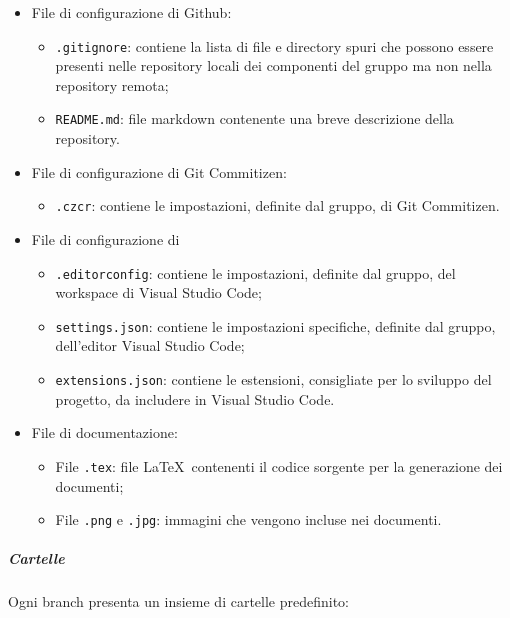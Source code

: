 \documentclass[../norme-di-progetto.tex]{subfiles}
\begin{document}
\begin{itemize}
  \item File di configurazione di Github:
  \begin{itemize}
    \item \texttt{.gitignore}: contiene la lista di file e directory spuri che possono essere presenti nelle repository locali dei componenti del gruppo ma non nella repository remota;
    \item \texttt{README.md}: file markdown contenente una breve descrizione della repository.
  \end{itemize}
  \item File di configurazione di Git Commitizen:
  \begin{itemize}
    \item \texttt{.czcr}: contiene le impostazioni, definite dal gruppo, di Git Commitizen.
  \end{itemize}
  \item File di configurazione di 
  \begin{itemize}
    \item \texttt{.editorconfig}: contiene le impostazioni, definite dal gruppo, del workspace di Visual Studio Code;
    \item \texttt{settings.json}: contiene le impostazioni specifiche, definite dal gruppo, dell'editor Visual Studio Code;
    \item \texttt{extensions.json}: contiene le estensioni, consigliate per lo sviluppo del progetto, da includere in Visual Studio Code.
  \end{itemize}
  \item File di documentazione:
  \begin{itemize}
    \item File \texttt{.tex}: file \LaTeX\ contenenti il codice sorgente per la generazione dei documenti;
    \item File \texttt{.png} e \texttt{.jpg}: immagini che vengono incluse nei documenti.
  \end{itemize}
\end{itemize}
\subparagraph*{Cartelle}
Ogni branch presenta un insieme di cartelle predefinito:
\end{document}
